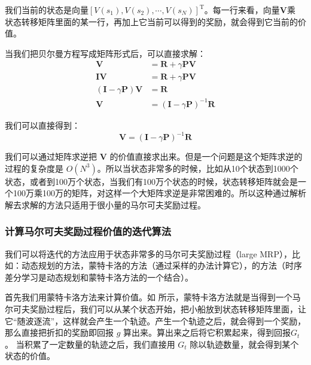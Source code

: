我们当前的状态是向量$[V(s_1),V(s_2),\cdots,V(s_N)]^\mathrm{T}$。每一行来看，向量$\boldsymbol{V}$乘
状态转移矩阵里面的某一行，再加上它当前可以得到的奖励，就会得到它当前的价值。


当我们把贝尔曼方程写成矩阵形式后，可以直接求解：
\begin{equation}
  \begin{aligned}
    \boldsymbol{V} &= \boldsymbol{\boldsymbol{R}}+ \gamma \boldsymbol{P}\boldsymbol{V} \\
    \boldsymbol{I}\boldsymbol{V} &= \boldsymbol{R}+ \gamma \boldsymbol{P}\boldsymbol{V} \\
    (\boldsymbol{I}-\gamma \boldsymbol{P})\boldsymbol{V}&=\boldsymbol{R} \\
    \boldsymbol{V}&=(\boldsymbol{I}-\gamma \boldsymbol{P})^{-1}\boldsymbol{R}
    \end{aligned}
  \label{eq:}
\end{equation}

我们可以直接得到：
\begin{equation}
  \boldsymbol{V}=(\boldsymbol{I}-\gamma \boldsymbol{P})^{-1} \boldsymbol{R}
  \label{eq:}
\end{equation}

我们可以通过矩阵求逆把 $\boldsymbol{V}$ 的价值直接求出来。但是一个问题是这个矩阵求逆的过程的复杂度是 $O(N^3)$。所以当状态非常多的时候，比如从10个状态到1000个状态，或者到100万个状态，当我们有100万个状态的时候，状态转移矩阵就会是一个100万乘100万的矩阵，对这样一个大矩阵求逆是非常困难的。所以这种通过解析解去求解的方法只适用于很小量的马尔可夫奖励过程。

\subsubsection{计算马尔可夫奖励过程价值的迭代算法} 

我们可以将迭代的方法应用于状态非常多的马尔可夫奖励过程（large MRP），比如：动态规划的方法，蒙特卡洛的方法（通过采样的办法计算它），的方法（时序差分学习是动态规划和蒙特卡洛方法的一个结合）。

首先我们用蒙特卡洛方法来计算价值。如 所示，蒙特卡洛方法就是当得到一个马尔可夫奖励过程后，我们可以从某个状态开始，把小船放到状态转移矩阵里面，让它“随波逐流”，这样就会产生一个轨迹。产生一个轨迹之后，就会得到一个奖励，那么直接把折扣的奖励即回报 $g$ 算出来。算出来之后将它积累起来，得到回报$G_t$。 当积累了一定数量的轨迹之后，我们直接用 $G_t$ 除以轨迹数量，就会得到某个状态的价值。

